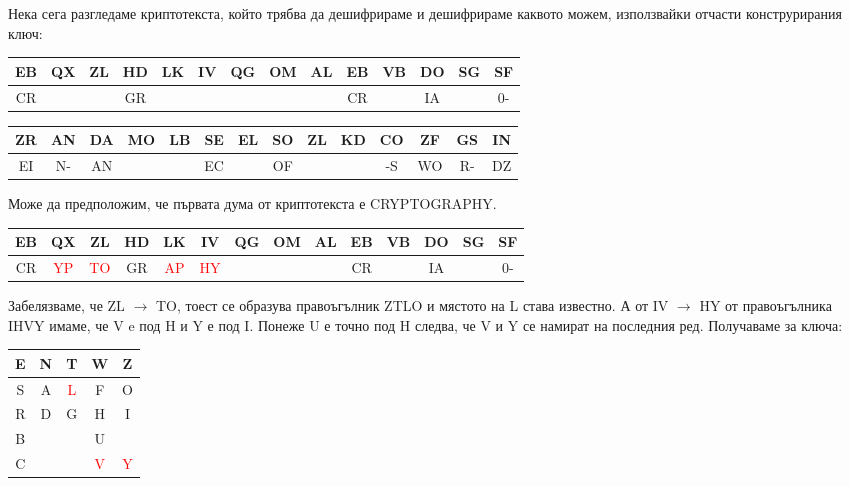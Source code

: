 \documentclass{article}
\begin{document}
\justify
Нека сега разгледаме криптотекста, който трябва да дешифрираме и дешифрираме каквото можем, използвайки отчасти конструрирания ключ: 

\begin{center}
\begin{tabular}{|c|c|c|c|c|c|c|c|c|c|c|c|c|c|}
        \hline
        EB & QX & ZL & HD & LK & IV & QG & OM & AL & EB & VB & DO & SG & SF \\
        \hline
        CR &  &  & GR &  &  &  &  &  & CR &  & IA &  & 0- \\
        \hline
        \end{tabular}
\end{center}

\begin{center}
\begin{tabular}{|c|c|c|c|c|c|c|c|c|c|c|c|c|c|}
        \hline
        ZR & AN & DA & MO & LB & SE & EL & SO & ZL & KD & CO & ZF & GS & IN \\
        \hline
        EI & N- & AN &  &  & EC &  & OF &  &  & -S & WO & R- & DZ \\
        \hline
        \end{tabular}
\end{center}

\justify
Може да предположим, че първата дума от криптотекста е CRYPTOGRAPHY.

\begin{center}
\begin{tabular}{|c|c|c|c|c|c|c|c|c|c|c|c|c|c|}
        \hline
        EB & QX & ZL & HD & LK & IV & QG & OM & AL & EB & VB & DO & SG & SF \\
        \hline
        CR & \textcolor{red}{YP} & \textcolor{red}{TO} & GR & \textcolor{red}{AP} & \textcolor{red}{HY} &  &  &  & CR &  & IA &  & 0- \\
        \hline
        \end{tabular}
\end{center}

\justify
Забелязваме, че ZL $\rightarrow$ TO, тоест се образува правоъгълник ZTLO и мястото на L става известно. А от IV $\rightarrow$ HY от правоъгълника IHVY имаме, че V e под H и Y е под I. Понеже U е точно под H следва, че V и Y се намират на последния ред. Получаваме за ключа:

\begin{center}
\begin{tabular}{|c|c|c|c|c|}
        \hline
        E & N & T & W & Z \\
        \hline
        S & A & \textcolor{red}{L} & F & O \\
        \hline
        R & D & G & H & I \\
        \hline
        B &  &  & U &  \\
        \hline
        C &  &  & \textcolor{red}{V} & \textcolor{red}{Y} \\
        \hline
        \end{tabular}
\end{center}
\end{document}
